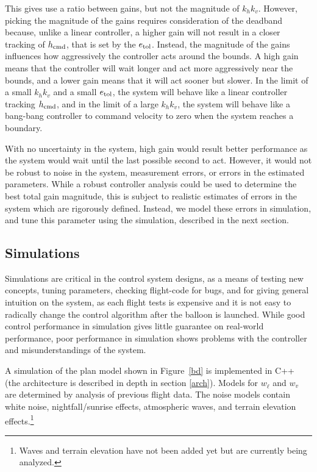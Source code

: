 \documentclass[11pt]{scrartcl} %
\begin{document}
This gives use a ratio between gains, but not the magnitude of $k_h k_v$. However, picking the magnitude of the gains requires consideration of the deadband because, unlike a linear controller, a higher gain will not result in a closer tracking of $h_{\mathrm{cmd}}$, that is set by the $e_{\mathrm{tol}}$. Instead, the magnitude of the gains influences how aggressively the controller acts around the bounds. A high gain means that the controller will wait longer and act more aggressively near the bounds, and a lower gain means that it will act sooner but slower. In the limit of a small $k_h k_v$ and a small $e_{\mathrm{tol}}$, the system will behave like a linear controller tracking $h_{\mathrm{cmd}}$, and in the limit of a large $k_h k_v$, the system will behave like a bang-bang controller to command velocity to zero when the system reaches a boundary.

With no uncertainty in the system, high gain would result better performance as the system would wait until the last possible second to act. However, it would not be robust to noise in the system, measurement errors, or errors in the estimated parameters. While a robust controller analysis could be used to determine the best total gain magnitude, this is subject to realistic estimates of errors in the system which are rigorously defined. Instead, we model these errors in simulation, and tune this parameter using the simulation, described in the next section.


\subsection{Simulations}
\label{simssec}
Simulations are critical in the control system designs, as a means of testing new concepts, tuning parameters, checking flight-code for bugs, and for giving general intuition on the system, as each flight tests is expensive and it is not easy to radically change the control algorithm after the balloon is launched. While good control performance in simulation gives little guarantee on real-world performance, poor performance in simulation shows problems with the controller and misunderstandings of the system.

A simulation of the plan model shown in Figure~\ref{bd} is implemented in C++ (the architecture is described in depth in section \ref{arch}). Models for $w_{\dot \ell}$ and $w_{v}$ are determined by analysis of previous flight data. The noise models contain white noise, nightfall/sunrise effects, atmospheric waves, and terrain elevation effects.\footnote{Waves and terrain elevation have not been added yet but are currently being analyzed.}
\end{document}
